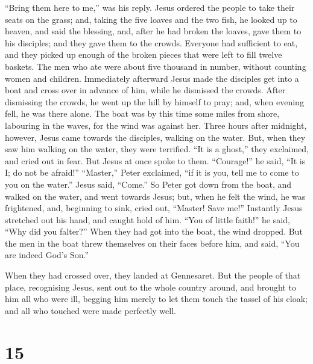  ``Bring them here to me,'' was his reply. 
Jesus ordered the people to take their seats on the grass; and, taking
the five loaves and the two fish, he looked up to heaven, and said the
blessing, and, after he had broken the loaves, gave them to his
disciples; and they gave them to the crowds.  Everyone had
sufficient to eat, and they picked up enough of the broken pieces that
were left to fill twelve baskets.  The men who ate were
about five thousand in number, without counting women and children.
 Immediately afterward Jesus made the disciples get into a
boat and cross over in advance of him, while he dismissed the crowds.
 After dismissing the crowds, he went up the hill by
himself to pray; and, when evening fell, he was there alone.
 The boat was by this time some miles from shore, labouring
in the waves, for the wind was against her.  Three hours
after midnight, however, Jesus came towards the disciples, walking on
the water.  But, when they saw him walking on the water,
they were terrified. ``It is a ghost,'' they exclaimed, and cried out in
fear.  But Jesus at once spoke to them. ``Courage!'' he
said, ``It is I; do not be afraid!''  ``Master,'' Peter
exclaimed, ``if it is you, tell me to come to you on the water.''
 Jesus said, ``Come.'' So Peter got down from the boat, and
walked on the water, and went towards Jesus;  but, when he
felt the wind, he was frightened, and, beginning to sink, cried out,
``Master! Save me!''  Instantly Jesus stretched out his
hand, and caught hold of him. ``You of little faith!'' he said, ``Why
did you falter?''  When they had got into the boat, the
wind dropped.  But the men in the boat threw themselves on
their faces before him, and said, ``You are indeed God's Son.''

 When they had crossed over, they landed at Gennesaret.
 But the people of that place, recognising Jesus, sent out
to the whole country around, and brought to him all who were ill,
 begging him merely to let them touch the tassel of his
cloak; and all who touched were made perfectly well.

\hypertarget{section-14}{%
\section{15}\label{section-14}}

